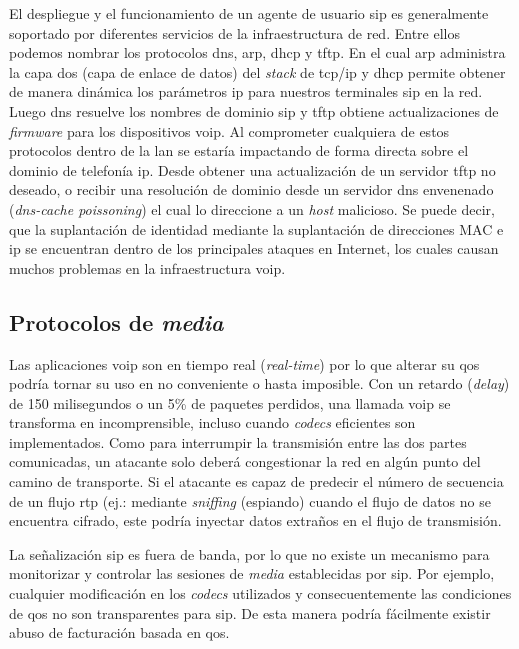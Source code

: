 \documentclass[a4paper,12pt]{report}
\begin{document}
El despliegue y el funcionamiento de un agente de usuario \ac{sip} es generalmente
soportado por diferentes servicios de la infraestructura de red. Entre ellos
podemos nombrar los protocolos \ac{dns}, \ac{arp},
\ac{dhcp} y \ac{tftp}. En el cual \ac{arp} administra la
capa dos (capa de enlace de datos) del \emph{stack} de \ac{tcp}/\ac{ip} y 
\ac{dhcp} permite obtener de manera dinámica los parámetros \ac{ip} para nuestros
terminales \ac{sip} en la red. Luego \ac{dns} resuelve los nombres de dominio \ac{sip} y \ac{tftp}
obtiene actualizaciones de \emph{firmware} para los dispositivos \ac{voip}. Al
comprometer cualquiera de estos protocolos dentro de la \ac{lan} se estaría impactando
de forma directa sobre el dominio de telefonía \ac{ip}. Desde obtener una
actualización de un servidor \ac{tftp} no deseado, o recibir una resolución de
dominio desde un servidor \ac{dns} envenenado (\emph{\ac{dns}-cache poissoning}) el cual lo
direccione a un \emph{host} malicioso. Se puede decir, que la suplantación de identidad
mediante la suplantación de direcciones MAC e \ac{ip} se encuentran dentro de los
principales ataques en Internet, los cuales causan muchos problemas en la
infraestructura \ac{voip}. \cite{nassarm} 

\newpage

\subsection{Protocolos de \emph{media}}

Las aplicaciones \ac{voip} son en tiempo real (\emph{real-time}) por lo que alterar
su \ac{qos} podría tornar su uso en no conveniente o hasta
imposible. Con un retardo (\emph{\mbox{delay}}) de 150 milisegundos o un 5\% de paquetes
perdidos, una llamada \ac{voip} se transforma en incomprensible, incluso cuando
\emph{codecs} eficientes son implementados. Como para interrumpir la transmisión
entre las dos partes comunicadas, un atacante solo deberá congestionar la red
en algún punto del camino de transporte. Si el atacante es capaz de predecir el
número de secuencia de un flujo \ac{rtp} (ej.: mediante \emph{sniffing} (espiando)
cuando el flujo de datos no se encuentra cifrado, este podría
inyectar datos extraños en el flujo de transmisión.

La se\-ña\-li\-za\-ción \ac{sip} es fuera de banda, por lo que no existe un mecanismo para
monitorizar y controlar las sesiones de \emph{media} establecidas por \ac{sip}. Por
ejemplo, cualquier modificación en los \emph{codecs} utilizados y consecuentemente las
condiciones de \ac{qos} no son transparentes para \ac{sip}. De esta manera podría
fácilmente existir abuso de facturación basada en \ac{qos}. \cite{nassarm}
\end{document}
